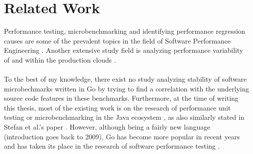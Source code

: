 \documentclass{seal_thesis}
\begin{document}
\clearpage


\section{Related Work}

Performance testing, microbenchmarking and identifying performance regression causes are some of the prevalent topics in the field of Software Performance Engineering \cite{laaber2019software, Laaber:2018:EOS:3196398.3196407, costa2019, chenshang, Nguyen:2014:ICS:2597073.2597092, Luo, Alcocer:2015:TDP:2816707.2816718, Stefan:2017:UTP:3030207.3030226, Horky:2015:UPU:2668930.2688051, Leitner:2017:ESS:3030207.3030213}. Another extensive study field is analyzing performance variability of and within the production clouds \cite{Iosup, Leitner:2016:PCS:2926746.2885497}.\\
\\
To the best of my knowledge, there exist no study analyzing stability of software microbechmarks written in Go by trying to find a correlation with the underlying source code features in these benchmarks. Furthermore, at the time of writing this thesis, most of the existing work is on the research of performance unit testing or microbenchmarking in the Java ecosystem \cite{Stefan:2017:UTP:3030207.3030226, Horky:2015:UPU:2668930.2688051, Leitner:2017:ESS:3030207.3030213, costa2019}, as also similarly stated in Stefan et al.'s paper \cite{Stefan:2017:UTP:3030207.3030226}. However, although being a fairly new language (introduction goes back to 2009), Go has become more popular in recent years and has taken its place in the research of software performance testing \cite{laaber2019software, Laaber:2018:EOS:3196398.3196407}.\\
\\
\end{document}
